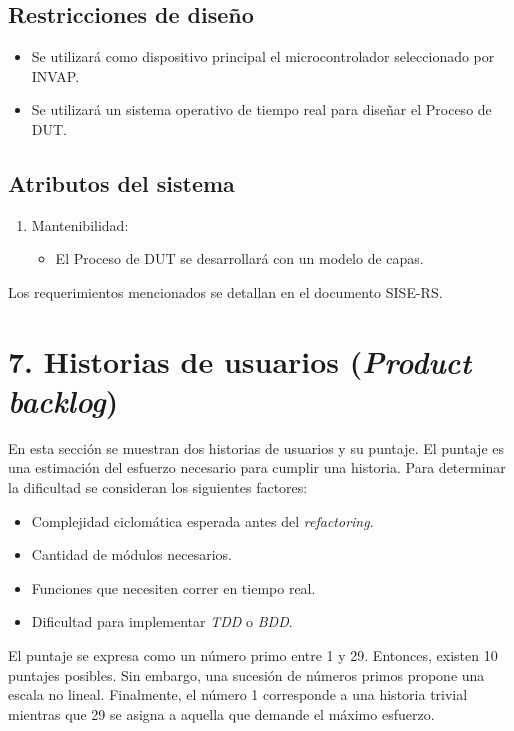 \documentclass[
11pt, %
]{charter}
\begin{document}
\subsection{Restricciones de diseño}
\label{sub:restriccionesDiseño}

\begin{itemize}
	\item Se utilizará como dispositivo principal el microcontrolador seleccionado por INVAP.
	\item Se utilizará un sistema operativo de tiempo real para diseñar el Proceso de DUT.
\end{itemize}

\subsection{Atributos del sistema}
\label{sub:atributos}

\begin{enumerate}
	\item Mantenibilidad:
	\begin{itemize}
		\item El Proceso de DUT se desarrollará con un modelo de capas.
	\end{itemize}
\end{enumerate}

Los requerimientos mencionados se detallan en el documento SISE-RS.

\section{7. Historias de usuarios (\textit{Product backlog})}
\label{sec:backlog}

En esta sección se muestran dos historias de usuarios y su puntaje.
El puntaje es una estimación del esfuerzo necesario para cumplir una historia.
Para determinar la dificultad se consideran los siguientes factores:

\begin{itemize}
	\item Complejidad ciclomática esperada antes del \emph{refactoring}.
	\item Cantidad de módulos necesarios.
	\item Funciones que necesiten correr en tiempo real.
	\item Dificultad para implementar \emph{TDD} o \emph{BDD}.
\end{itemize}

El puntaje se expresa como un número primo entre 1 y 29.
Entonces, existen 10 puntajes posibles.
Sin embargo, una sucesión de números primos propone una escala no lineal.
Finalmente, el número 1 corresponde a una historia trivial mientras que 29 se asigna a aquella que demande el máximo esfuerzo.
\end{document}
